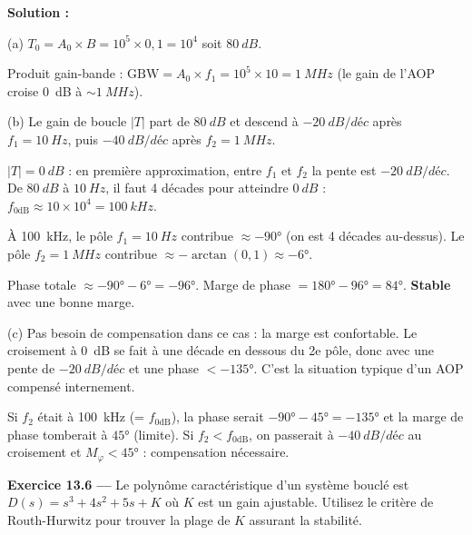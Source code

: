 \documentclass[12pt,a4paper,twoside]{book}
\begin{document}
\begin{pratique}
\textbf{Solution :}

(a) $T_0 = A_0 \times B = 10^5 \times 0{,}1 = 10^4$ soit $\SI{80}{dB}$.

Produit gain-bande : $\text{GBW} = A_0 \times f_1 = 10^5 \times 10 = \SI{1}{MHz}$ (le gain de l'AOP croise \SI{0}{dB} à $\sim\SI{1}{MHz}$).

(b) Le gain de boucle $|T|$ part de $\SI{80}{dB}$ et descend à $-\SI{20}{dB/déc}$ après $f_1 = \SI{10}{Hz}$, puis $-\SI{40}{dB/déc}$ après $f_2 = \SI{1}{MHz}$.

$|T| = \SI{0}{dB}$ : en première approximation, entre $f_1$ et $f_2$ la pente est $-\SI{20}{dB/déc}$. De $\SI{80}{dB}$ à $\SI{10}{Hz}$, il faut 4 décades pour atteindre $\SI{0}{dB}$ : $f_{0\text{dB}} \approx 10 \times 10^4 = \SI{100}{kHz}$.

À \SI{100}{kHz}, le pôle $f_1 = \SI{10}{Hz}$ contribue $\approx -90°$ (on est 4 décades au-dessus). Le pôle $f_2 = \SI{1}{MHz}$ contribue $\approx -\arctan(0{,}1) \approx -6°$.

Phase totale $\approx -90° - 6° = -96°$. Marge de phase $= 180° - 96° = 84°$. \textbf{Stable} avec une bonne marge.

(c) Pas besoin de compensation dans ce cas : la marge est confortable. Le croisement à \SI{0}{dB} se fait à une décade en dessous du 2e pôle, donc avec une pente de $-\SI{20}{dB/déc}$ et une phase $< -135°$. C'est la situation typique d'un AOP compensé internement.

Si $f_2$ était à \SI{100}{kHz} (= $f_{0\text{dB}}$), la phase serait $-90° - 45° = -135°$ et la marge de phase tomberait à $45°$ (limite). Si $f_2 < f_{0\text{dB}}$, on passerait à $-\SI{40}{dB/déc}$ au croisement et $M_\varphi < 45°$ : compensation nécessaire.
\end{pratique}

\textbf{Exercice 13.6 ---} Le polynôme caractéristique d'un système bouclé est $D(s) = s^3 + 4s^2 + 5s + K$ où $K$ est un gain ajustable. Utilisez le critère de Routh-Hurwitz pour trouver la plage de $K$ assurant la stabilité.
\end{document}
